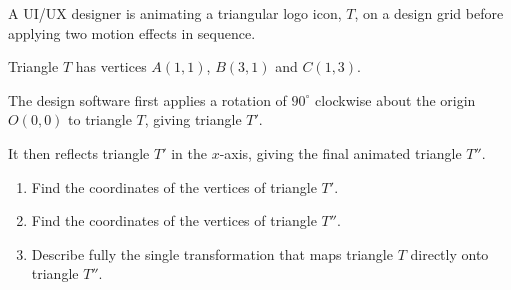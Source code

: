 \begin{question}
\noindent A UI/UX designer is animating a triangular logo icon, $T$, on a design grid before applying two motion effects in sequence.

Triangle $T$ has vertices $A(1,1)$, $B(3,1)$ and $C(1,3)$.

\begin{center}
\end{center}

\noindent The design software first applies a rotation of $90^\circ$ clockwise about the origin $O(0,0)$ to triangle $T$, giving triangle $T'$.

\noindent It then reflects triangle $T'$ in the $x$-axis, giving the final animated triangle $T''$.

\begin{enumerate}
    \item[(a)] Find the coordinates of the vertices of triangle $T'$.

    \vspace{4cm}

    \item[(b)] Find the coordinates of the vertices of triangle $T''$.

    \vspace{3.5cm}

    \item[(c)] Describe fully the single transformation that maps triangle $T$ directly onto triangle $T''$.

    \vspace{3cm}
\end{enumerate}
\end{question}
